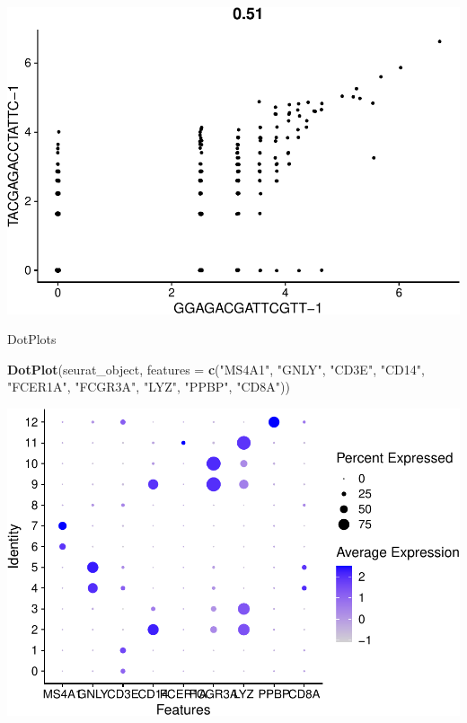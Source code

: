\documentclass[
]{book}
\newenvironment{Shaded}{\begin{snugshade}}{\end{snugshade}}
\newcommand{\AttributeTok}[1]{\textcolor[rgb]{0.13,0.29,0.53}{#1}}
\newcommand{\FunctionTok}[1]{\textcolor[rgb]{0.13,0.29,0.53}{\textbf{#1}}}
\newcommand{\NormalTok}[1]{#1}
\newcommand{\StringTok}[1]{\textcolor[rgb]{0.31,0.60,0.02}{#1}}
\begin{document}
\includegraphics{scRNAseqInR_ABACBS_2024_Doco_files/figure-latex/unnamed-chunk-26-2.pdf}

DotPlots

\begin{Shaded}
\begin{Highlighting}[]
\FunctionTok{DotPlot}\NormalTok{(seurat\_object, }\AttributeTok{features =} \FunctionTok{c}\NormalTok{(}\StringTok{"MS4A1"}\NormalTok{, }\StringTok{"GNLY"}\NormalTok{, }\StringTok{"CD3E"}\NormalTok{, }\StringTok{"CD14"}\NormalTok{, }\StringTok{"FCER1A"}\NormalTok{, }\StringTok{"FCGR3A"}\NormalTok{, }\StringTok{"LYZ"}\NormalTok{, }\StringTok{"PPBP"}\NormalTok{, }\StringTok{"CD8A"}\NormalTok{))}
\end{Highlighting}
\end{Shaded}

\includegraphics{scRNAseqInR_ABACBS_2024_Doco_files/figure-latex/unnamed-chunk-27-1.pdf}
\end{document}
